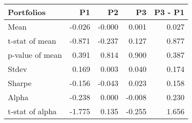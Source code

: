 \begin{tabular}{lrrrr}
\toprule
Portfolios & P1 & P2 & P3 & P3 - P1 \\
\midrule
Mean & -0.026 & -0.000 & 0.001 & 0.027 \\
t-stat of mean & -0.871 & -0.237 & 0.127 & 0.877 \\
p-value of mean & 0.391 & 0.814 & 0.900 & 0.387 \\
Stdev & 0.169 & 0.003 & 0.040 & 0.174 \\
Sharpe & -0.156 & -0.043 & 0.023 & 0.158 \\
Alpha & -0.238 & 0.000 & -0.008 & 0.230 \\
t-stat of alpha & -1.775 & 0.135 & -0.255 & 1.656 \\
\bottomrule
\end{tabular}
